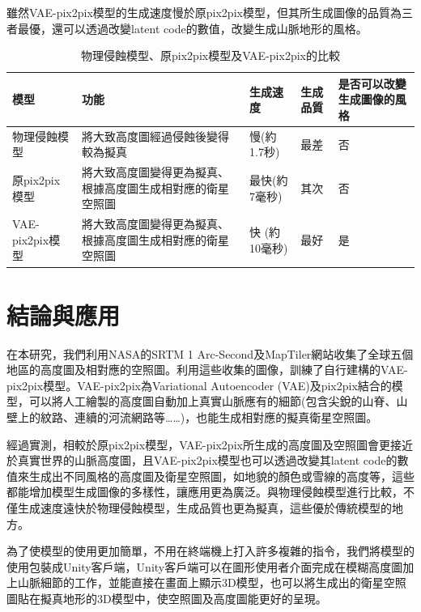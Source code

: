 \documentclass[a4paper, 12pt]{article}
\begin{document}
雖然VAE-pix2pix模型的生成速度慢於原pix2pix模型，但其所生成圖像的品質為三者最優，還可以透過改變latent code的數值，改變生成山脈地形的風格。
\begin{table}[htbp]
    \caption{物理侵蝕模型、原pix2pix模型及VAE-pix2pix的比較}
    \label{tab:9}
    \begin{tabularx}{\linewidth}{|Y|Y|Y|Y|Y|}
        \hline
        \textbf{模型}   & \textbf{功能}                                              & \textbf{生成速度} & \textbf{生成品質} & \textbf{是否可以改變生成圖像的風格} \\ \hline
        物理侵蝕模型    & 將大致高度圖經過侵蝕後變得較為擬真                         & 慢(約1.7秒)       & 最差              & 否                                  \\ \hline
        原pix2pix模型   & 將大致高度圖變得更為擬真、根據高度圖生成相對應的衛星空照圖 & 最快(約7毫秒)     & 其次              & 否                                  \\ \hline
        VAE-pix2pix模型 & 將大致高度圖變得更為擬真、根據高度圖生成相對應的衛星空照圖 & 快 (約10毫秒)     & 最好              & 是                                  \\ \hline
    \end{tabularx}
\end{table}
\section{結論與應用}

在本研究，我們利用NASA的SRTM 1 Arc-Second及MapTiler網站收集了全球五個地區的高度圖及相對應的空照圖。利用這些收集的圖像，訓練了自行建構的VAE-pix2pix模型。VAE-pix2pix為Variational Autoencoder (VAE)及pix2pix結合的模型，可以將人工繪製的高度圖自動加上真實山脈應有的細節(包含尖銳的山脊、山壁上的紋路、連續的河流網路等……)，也能生成相對應的擬真衛星空照圖。

經過實測，相較於原pix2pix模型，VAE-pix2pix所生成的高度圖及空照圖會更接近於真實世界的山脈高度圖，且VAE-pix2pix模型也可以透過改變其latent code的數值來生成出不同風格的高度圖及衛星空照圖，如地貌的顏色或雪線的高度等，這些都能增加模型生成圖像的多樣性，讓應用更為廣泛。與物理侵蝕模型進行比較，不僅生成速度遠快於物理侵蝕模型，生成品質也更為擬真，這些優於傳統模型的地方。

為了使模型的使用更加簡單，不用在終端機上打入許多複雜的指令，我們將模型的使用包裝成Unity客戶端，Unity客戶端可以在圖形使用者介面完成在模糊高度圖加上山脈細節的工作，並能直接在畫面上顯示3D模型，也可以將生成出的衛星空照圖貼在擬真地形的3D模型中，使空照圖及高度圖能更好的呈現。
\end{document}
